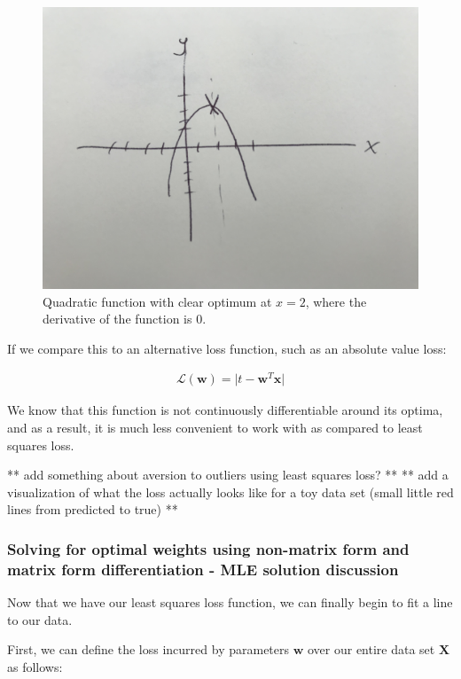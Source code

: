 \begin{figure}[H]
    \centering
    \includegraphics[width=0.5\paperwidth]{../LinearRegression/fig/deriv_at_2.jpg}
    \caption{Quadratic function with clear optimum at $x=2$, where the derivative of the function is 0.}
    \label{fig:quad-deriv-at-2}
\end{figure}

If we compare this to an alternative loss function, such as an absolute value loss:

\begin{align}
    \mathcal{L}(\textbf{w}) = \lvert t - \textbf{w}^{T}\textbf{x} \rvert
\end{align}

We know that this function is not continuously differentiable around its optima, and as a result, it is much less convenient to work with as compared to least squares loss.

** add something about aversion to outliers using least squares loss? **
** add a visualization of what the loss actually looks like for a toy data set (small little red lines from predicted to true) **

\subsubsection{Solving for optimal weights using non-matrix form and matrix form differentiation - MLE solution discussion}
Now that we have our least squares loss function, we can finally begin to fit a line to our data.

First, we can define the loss incurred by parameters $\textbf{w}$ over our entire data set $\textbf{X}$ as follows:

